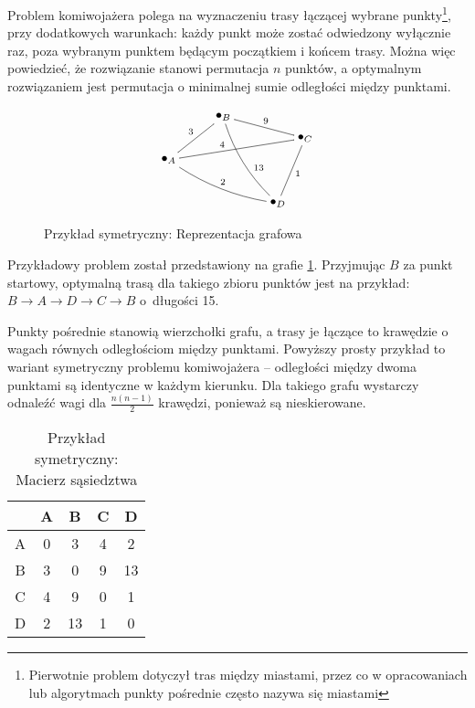 Problem komiwojażera polega na wyznaczeniu trasy łączącej wybrane punkty\footnote{Pierwotnie problem dotyczył tras między miastami, przez co w opracowaniach lub algorytmach punkty pośrednie często nazywa się miastami}, przy dodatkowych warunkach: każdy punkt może zostać odwiedzony wyłącznie raz, poza wybranym punktem będącym początkiem i końcem trasy. Można więc powiedzieć, że rozwiązanie stanowi permutacja $n$ punktów, a optymalnym rozwiązaniem jest permutacja o minimalnej sumie odległości między punktami\cite{genetyczne}.
		
\begin{figure}[h!]
	\begin{displaymath}
	\xygraph{
		!{<0cm,0cm>;<1.5cm,0cm>:<0cm,1.2cm>::}
		!{(0,0) }*+{\bullet_{A}}="a"
		!{(1,1) }*+{\bullet_{B}}="b"
		!{(2.5,0.5) }*+{\bullet_{C}}="c"
		!{(2,-1)}*+{\bullet_{D}}="d"
		"a"-"b" ^3
		"a"-"c" ^(0.4)4
		"a"-@/_/"d" ^2
		"b"-"c" ^9
		"b"-@/_/"d" ^(0.6){13} 
		"c"-"d" ^1
	}
\end{displaymath}
\caption{Przykład symetryczny: Reprezentacja grafowa}
\label{fig:przyklad1_komiwojazer_graf}
\end{figure}
Przykładowy problem został przedstawiony na grafie \ref{fig:przyklad1_komiwojazer_graf}. Przyjmując $B$ za punkt startowy, optymalną trasą dla takiego zbioru punktów jest na przykład: $B \to A \to D \to C \to B$ o~długości 15.

Punkty pośrednie stanowią wierzchołki grafu, a trasy je łączące to krawędzie o wagach równych odległościom między punktami. Powyższy prosty przykład to wariant symetryczny problemu komiwojażera -- odległości między dwoma punktami są identyczne w każdym kierunku. Dla takiego grafu wystarczy odnaleźć wagi dla $\frac{n(n-1)}{2}$ krawędzi, ponieważ są nieskierowane.

\begin{table}
	\begin{center}
		\begin{tabular}
			{  c | c c c c }
			& A & B & C & D \\
			\hline
			A & 0 & 3 & 4 & 2 \\
			B & 3 & 0 & 9 &13 \\
			C & 4 & 9 & 0 & 1 \\
			D & 2 &13 & 1 & 0 \\
		\end{tabular}
	\end{center}
	\caption{Przykład symetryczny: Macierz sąsiedztwa}
\end{table}

